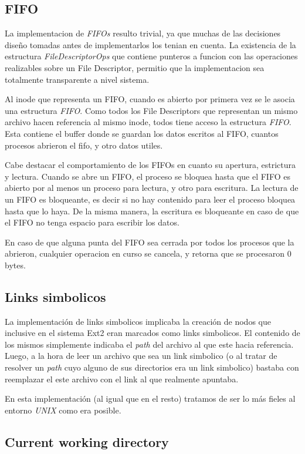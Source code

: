 \documentclass[a4paper,10pt]{article}
\begin{document}
\subsection{FIFO}
La implementacion de \textit{FIFOs} resulto trivial, ya que muchas de las decisiones diseño tomadas antes de implementarlos los tenian en cuenta.
La existencia de la estructura \textit{FileDescriptorOps} que contiene punteros a funcion con las operaciones realizables sobre un File Descriptor, permitio que la implementacion sea totalmente transparente a nivel sistema.

Al inode que representa un FIFO, cuando es abierto por primera vez se le asocia una estructura \textit{FIFO}.
Como todos los File Descriptors que representan un mismo archivo hacen referencia al mismo inode, todos tiene acceso la estructura \textit{FIFO}.
Esta contiene el buffer donde se guardan los datos escritos al FIFO, cuantos procesos abrieron el fifo, y otro datos utiles.

Cabe destacar el comportamiento de los FIFOs en cuanto su apertura, estrictura y lectura.
Cuando se abre un FIFO, el proceso se bloquea hasta que el FIFO es abierto por al menos un proceso para lectura, y otro para escritura.
La lectura de un FIFO es bloqueante, es decir si no hay contenido para leer el proceso bloquea hasta que lo haya.
De la misma manera, la escritura es bloqueante en caso de que el FIFO no tenga espacio para escribir los datos.

En caso de que alguna punta del FIFO sea cerrada por todos los procesos que la abrieron, cualquier operacion en curso se cancela, y retorna que se procesaron 0 bytes.

\subsection{Links simbolicos}
La implementación de links simbolicos implicaba la creación de nodos que inclusive en el sistema Ext2 eran marcados
como links simbolicos. El contenido de los mismos simplemente indicaba el \textit{path} del archivo al que este
hacia referencia.
Luego, a la hora de leer un archivo que sea un link simbolico (o al tratar de resolver un \textit{path} cuyo alguno
de sus directorios era un link simbolico) bastaba con reemplazar el este archivo con el link al que realmente
apuntaba.

En esta implementación (al igual que en el resto) tratamos de ser lo más fieles al entorno \textit{UNIX} como 
era posible.

\subsection{Current working directory}
    
\end{document}

